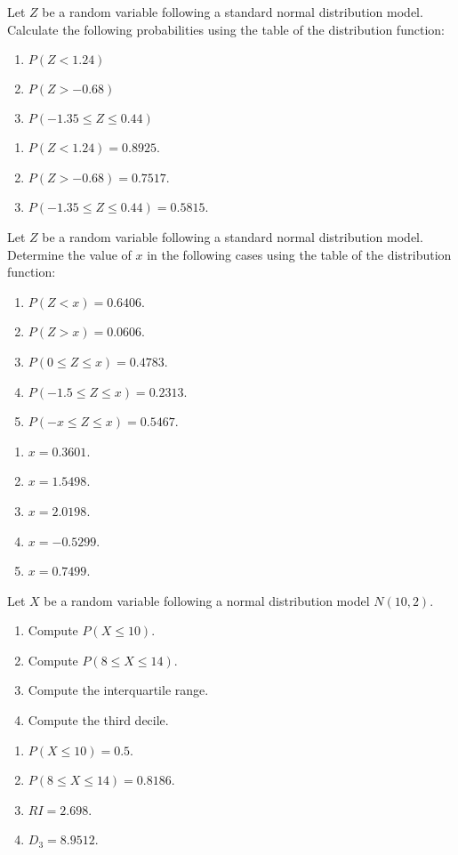 {Let $Z$ be a random variable following a standard normal distribution model.
Calculate the following probabilities using the table of the distribution function:
\begin{enumerate}
\item $P(Z<1.24)$
\item $P(Z>-0.68)$
\item $P(-1.35\leq Z\leq 0.44)$
\end{enumerate}
}
{
\begin{enumerate}
\item $P(Z<1.24)=0.8925$.
\item $P(Z>-0.68)=0.7517$.
\item $P(-1.35\leq Z\leq 0.44)=0.5815$.
\end{enumerate}
}
{}


{Let $Z$ be a random variable following a standard normal distribution model.
Determine the value of $x$ in the following cases using the table of the distribution function:
\begin{enumerate}
\item $P(Z<x)=0.6406$.
\item $P(Z>x)=0.0606$.
\item $P(0\leq Z\leq x)=0.4783$.
\item $P(-1.5\leq Z\leq x)=0.2313$.
\item $P(-x\leq Z\leq x)=0.5467$.
\end{enumerate}
}
{
\begin{enumerate}
\item $x=0.3601$.
\item $x=1.5498$.
\item $x=2.0198$.
\item $x=-0.5299$.
\item $x=0.7499$.
\end{enumerate}
}
{}


{Let $X$ be a random variable following a normal distribution model $N(10,2)$.
\begin{enumerate}
\item Compute $P(X\leq 10)$.
\item Compute $P(8\leq X\leq 14)$.
\item Compute the interquartile range.
\item Compute the third decile.
\end{enumerate}
}
{
\begin{enumerate}
\item $P(X\leq 10)=0.5$.
\item $P(8\leq X\leq 14)=0.8186$.
\item $RI=2.698$.
\item $D_3=8.9512$.
\end{enumerate}
}
{
}


